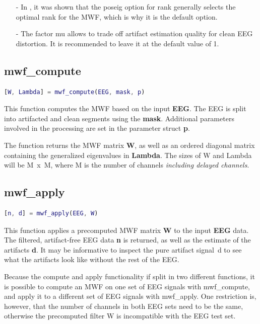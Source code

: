 \documentclass[11pt]{article}
\begin{document}
\begin{itemize}[noitemsep]
\item[-] In \cite{somers2018generic}, it was shown that the poseig option for rank generally selects the optimal rank for the MWF, which is why it is the default option.
\item[-] The factor mu allows to trade off artifact estimation quality for clean EEG distortion. It is recommended to leave it at the default value of 1.
\end{itemize}

\newpage
\subsection{mwf\_compute}
\label{mwfcompute}

\begin{lstlisting}[frame=single, language=matlab]
[W, Lambda] = mwf_compute(EEG, mask, p)
\end{lstlisting}

This function computes the MWF based on the input \textbf{EEG}. The EEG is split into artifacted and clean segments using the \textbf{mask}. Additional parameters involved in the processing are set in the parameter struct \textbf{p}.

The function returns the MWF matrix \textbf{W}, as well as an ordered diagonal matrix containing the generalized eigenvalues in \textbf{Lambda}. The sizes of W and Lambda will be M~x~M, where M is the number of channels \emph{including delayed channels}. 

\subsection{mwf\_apply}

\begin{lstlisting}[frame=single, language=matlab]
[n, d] = mwf_apply(EEG, W)
\end{lstlisting}

This function applies a precomputed MWF matrix \textbf{W} to the input \textbf{EEG} data. The filtered, artifact-free EEG data \textbf{n} is returned, as well as the estimate of the artifacts \textbf{d}. It may be informative to inspect the pure artifact signal~d to see what the artifacts look like without the rest of the EEG.

Because the compute and apply functionality if split in two different functions, it is possible to compute an MWF on one set of EEG signals with mwf\_compute, and apply it to a different set of EEG signals with mwf\_apply. One restriction is, however, that the number of channels in both EEG sets need to be the same, otherwise the precomputed filter W is incompatible with the EEG test set.
\end{document}
